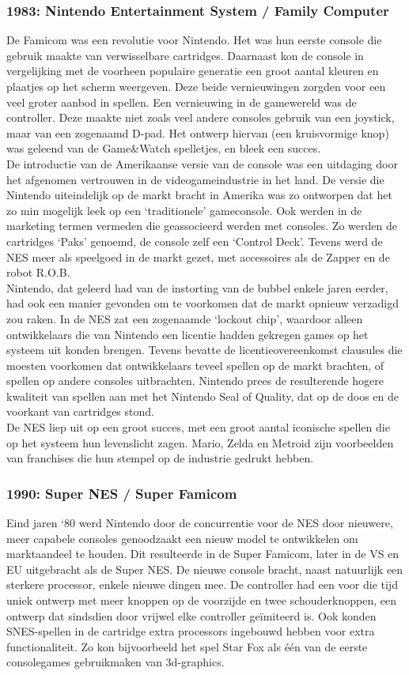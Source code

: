\documentclass{article}
\begin{document}
\subsubsection{1983: Nintendo Entertainment System / Family Computer}
De Famicom was een revolutie voor Nintendo. Het was hun eerste console die gebruik maakte van verwisselbare cartridges. Daarnaast kon de console in vergelijking met de voorheen populaire generatie een groot aantal kleuren en plaatjes op het scherm weergeven. Deze beide vernieuwingen zorgden voor een veel groter aanbod in spellen.
Een vernieuwing in de gamewereld was de controller. Deze maakte niet zoals veel andere consoles gebruik van een joystick, maar van een zogenaamd D-pad. Het ontwerp hiervan (een kruisvormige knop) was geleend van de Game\&Watch spelletjes, en bleek een succes. \\ 
De introductie van de Amerikaanse versie van de console was een uitdaging door het afgenomen vertrouwen in de videogameindustrie in het land. De versie die Nintendo uiteindelijk op de markt bracht in Amerika was zo ontworpen dat het zo min mogelijk leek op een `traditionele' gameconsole. Ook werden in de marketing termen vermeden die geassocieerd werden met consoles. Zo werden de cartridges `Paks' genoemd, de console zelf een `Control Deck'. Tevens werd de NES meer als speelgoed in de markt gezet, met accessoires als de Zapper en de robot R.O.B. \\ 
Nintendo, dat geleerd had van de instorting van de bubbel enkele jaren eerder, had ook een manier gevonden om te voorkomen dat de markt opnieuw verzadigd zou raken. In de NES zat een zogenaamde `lockout chip', waardoor alleen ontwikkelaars die van Nintendo een licentie hadden gekregen games op het systeem uit konden brengen. Tevens bevatte de licentieovereenkomst clausules die moesten voorkomen dat ontwikkelaars teveel spellen op de markt brachten, of spellen op andere consoles uitbrachten. Nintendo prees de resulterende hogere kwaliteit van spellen aan met het Nintendo Seal of Quality, dat op de doos en de voorkant van cartridges stond.\\ 
De NES liep uit op een groot succes, met een groot aantal iconische spellen die op het systeem hun levenslicht zagen. Mario, Zelda en Metroid zijn voorbeelden van franchises die hun stempel op de industrie gedrukt hebben.

\subsubsection{1990: Super NES / Super Famicom}
Eind jaren `80 werd Nintendo door de concurrentie voor de NES door nieuwere, meer capabele consoles genoodzaakt een nieuw model te ontwikkelen om marktaandeel te houden. Dit resulteerde in de Super Famicom, later in de VS en EU uitgebracht als de Super NES. 
De nieuwe console bracht, naast natuurlijk een sterkere processor, enkele nieuwe dingen mee. De controller had een voor die tijd uniek ontwerp met meer knoppen op de voorzijde en twee schouderknoppen, een ontwerp dat sindsdien door vrijwel elke controller geïmiteerd is.
Ook konden SNES-spellen in de cartridge extra processors ingebouwd hebben voor extra functionaliteit. Zo kon bijvoorbeeld het spel Star Fox als één van de eerste consolegames gebruikmaken van 3d-graphics.
\end{document}
